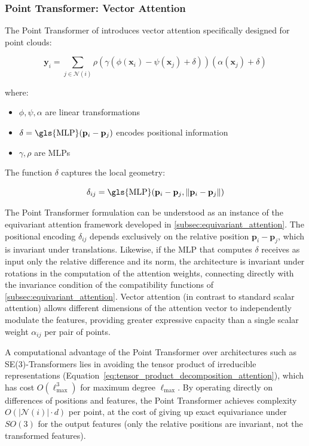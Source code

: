 \subsubsection{Point \gls{Transformer}: Vector Attention}

The Point \gls{Transformer} of \citet{zhao2021point} introduces vector attention specifically designed for point clouds:

\begin{equation}
    \mathbf{y}_i = \sum_{j \in \mathcal{N}(i)} \rho(\gamma(\phi(\mathbf{x}_i) - \psi(\mathbf{x}_j) + \delta))(\alpha(\mathbf{x}_j) + \delta)
    \label{eq:point_transformer_attention}
\end{equation}

where:
\begin{itemize}
    \item $\phi, \psi, \alpha$ are linear transformations
    \item $\delta = \text{\gls{MLP}}(\mathbf{p}_i - \mathbf{p}_j)$ encodes positional information
    \item $\gamma, \rho$ are \glspl{MLP}
\end{itemize}

The function $\delta$ captures the local geometry:

\begin{equation}
    \delta_{ij} = \text{\gls{MLP}}(\mathbf{p}_i - \mathbf{p}_j, \|\mathbf{p}_i - \mathbf{p}_j\|)
    \label{eq:positional_encoding_3d}
\end{equation}

The Point \gls{Transformer} formulation can be understood as an instance of the equivariant attention framework developed in \autoref{subsec:equivariant_attention}. The positional encoding $\delta_{ij}$ depends exclusively on the relative position $\mathbf{p}_i - \mathbf{p}_j$, which is invariant under translations. Likewise, if the \gls{MLP} that computes $\delta$ receives as input only the relative difference and its norm, the architecture is invariant under rotations in the computation of the attention weights, connecting directly with the invariance condition of the compatibility functions of \autoref{subsec:equivariant_attention}. Vector attention (in contrast to standard scalar attention) allows different dimensions of the attention vector to independently modulate the features, providing greater expressive capacity than a single scalar weight $\alpha_{ij}$ per pair of points.

A computational advantage of the Point \gls{Transformer} over architectures such as SE(3)-\glspl{Transformer} lies in avoiding the tensor product of irreducible representations (Equation~\eqref{eq:tensor_product_decomposition_attention}), which has cost $O(\ell_{\max}^3)$ for maximum degree $\ell_{\max}$. By operating directly on differences of positions and features, the Point \gls{Transformer} achieves complexity $O(|\mathcal{N}(i)| \cdot d)$ per point, at the cost of giving up exact equivariance under $SO(3)$ for the output features (only the relative positions are invariant, not the transformed features).
